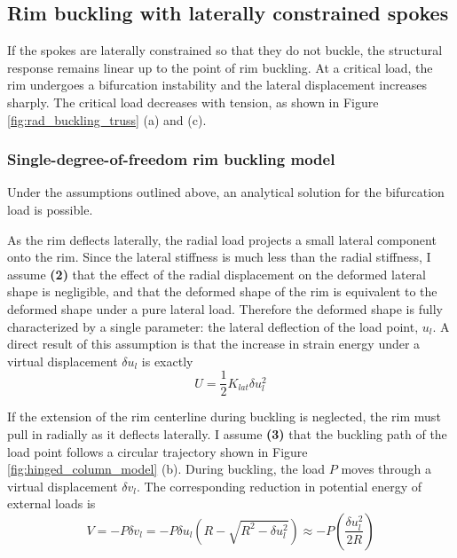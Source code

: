 \documentclass[\rootdir/thesis.tex]{subfiles}
\begin{document}
\subsection{Rim buckling with laterally constrained spokes}

If the spokes are laterally constrained so that they do not buckle, the structural response remains linear up to the point of rim buckling. At a critical load, the rim undergoes a bifurcation instability and the lateral displacement increases sharply. The critical load decreases with tension, as shown in Figure \ref{fig:rad_buckling_truss} (a) and (c).

\subsubsection{Single-degree-of-freedom rim buckling model}

Under the assumptions outlined above, an analytical solution for the bifurcation load is possible.

As the rim deflects laterally, the radial load projects a small lateral component onto the rim. Since the lateral stiffness is much less than the radial stiffness, I assume \textbf{(2)} that the effect of the radial displacement on the deformed lateral shape is negligible, and that the deformed shape of the rim is equivalent to the deformed shape under a pure lateral load. Therefore the deformed shape is fully characterized by a single parameter: the lateral deflection of the load point, $u_l$. A direct result of this assumption is that the increase in strain energy under a virtual displacement $\delta u_l$ is exactly
\begin{equation}
\label{eq:U_rim_1dof}
U = \frac{1}{2}K_{lat}\delta u_l^2
\end{equation}

If the extension of the rim centerline during buckling is neglected, the rim must pull in radially as it deflects laterally. I assume \textbf{(3)} that the buckling path of the load point follows a circular trajectory shown in Figure \ref{fig:hinged_column_model} (b). During buckling, the load $P$ moves through a virtual displacement $\delta v_l$. The corresponding reduction in potential energy of external loads is
\begin{equation}
\label{eq:V_rim_1dof}
V = -P\delta v_l = -P \delta u_l \left(R - \sqrt{R^2 - \delta u_l^2}\right)
\approx -P \left(\frac{\delta u_l^2}{2R}\right)
\end{equation}
\end{document}
